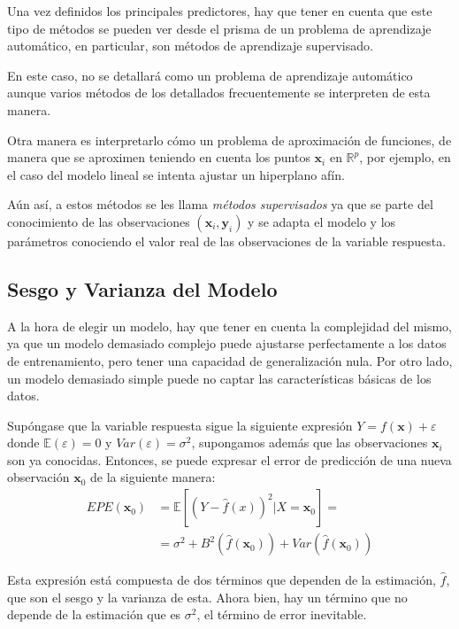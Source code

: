 \noindent Una vez definidos los principales predictores, hay que tener en cuenta que este tipo de métodos se pueden ver desde el prisma de un problema de aprendizaje automático, en particular, son métodos de aprendizaje supervisado.

\noindent En este caso, no se detallará como un problema de aprendizaje automático aunque varios métodos de los detallados frecuentemente se interpreten de esta manera. 

\noindent Otra manera es interpretarlo cómo un problema de aproximación de funciones, de manera que se aproximen teniendo en cuenta los puntos $\textbf{x}_i$ en $\mathbb{R}^p$, por ejemplo, en el caso del modelo lineal se intenta ajustar un hiperplano afín. 

\noindent Aún así, a estos métodos se les llama \textit{métodos supervisados} ya que se parte del conocimiento de las observaciones $(\textbf{x}_i,\textbf{y}_i)$ y se adapta el modelo y los parámetros conociendo el valor real de las observaciones de la variable respuesta. 

\subsection{Sesgo y Varianza del Modelo}

\noindent A la hora de elegir un modelo, hay que tener en cuenta la complejidad del mismo, ya que un modelo demasiado complejo puede ajustarse perfectamente a los datos de entrenamiento, pero tener una capacidad de generalización nula. Por otro lado, un modelo demasiado simple puede no captar las características básicas de los datos. 

\noindent Supóngase que la variable respuesta sigue la siguiente expresión $Y=f(\textbf{x})+\varepsilon$ donde $\mathbb{E}(\varepsilon)=0$ y $Var(\varepsilon)=\sigma^2$, supongamos además que las observaciones $\textbf{x}_i$ son ya conocidas. Entonces, se puede expresar el error de predicción de una nueva observación $\textbf{x}_0$ de la siguiente manera:
\begin{equation}
\begin{split}
EPE(\textbf{x}_0)&=\mathbb{E}[(Y-\hat{f}(x))^2|X=\textbf{x}_0]=\\
&=\sigma^2+B^2(\hat{f}(\textbf{x}_0))+Var(\hat{f}(\textbf{x}_0))
\end{split}
\end{equation}

\noindent Esta expresión está compuesta de dos términos que dependen de la estimación, $\hat{f}$, que son el sesgo y la varianza de esta. Ahora bien, hay un término que no depende de la estimación que es $\sigma^2$, el término de error inevitable. 

